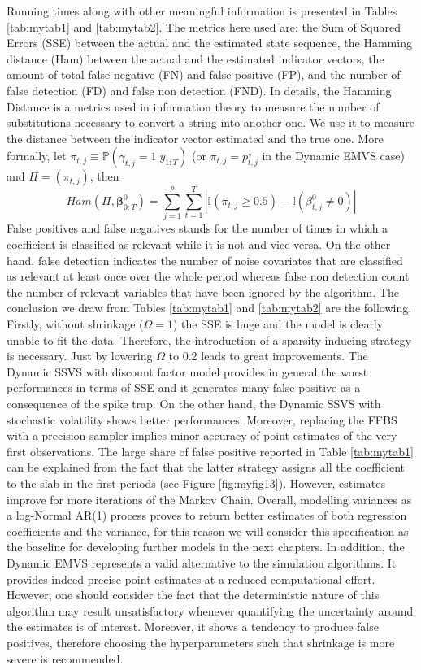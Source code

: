 \documentclass[
  12pt,
]{book}
\theoremstyle{break}
\theoremstyle{nonumberplain}
\begin{document}
Running times along with other meaningful information is presented in
Tables \ref{tab:mytab1} and \ref{tab:mytab2}. The metrics here used are:
the Sum of Squared Errors (SSE) between the actual and the estimated
state sequence, the Hamming distance (Ham) between the actual and the
estimated indicator vectors, the amount of total false negative (FN) and
false positive (FP), and the number of false detection (FD) and false
non detection (FND). In details, the Hamming Distance is a metrics used
in information theory to measure the number of substitutions necessary
to convert a string into another one. We use it to measure the distance
between the indicator vector estimated and the true one. More formally,
let \(\pi_{t,j}\equiv \mathbb{P}(\gamma_{t,j}=1|y_{1:T})\) (or
\(\pi_{t,j}=p^{\star}_{t,j}\) in the Dynamic EMVS case) and
\(\Pi=(\pi_{t,j})\), then \[
Ham(\Pi,\boldsymbol{\beta}_{0:T}^{0})=\sum_{j=1}^{p}\sum_{t=1}^{T}|\mathbb{I}(\pi_{t,j} \geq 0.5)-\mathbb{I}(\beta_{t,j}^{0}\neq 0)|
\] False positives and false negatives stands for the number of times in
which a coefficient is classified as relevant while it is not and vice
versa. On the other hand, false detection indicates the number of noise
covariates that are classified as relevant at least once over the whole
period whereas false non detection count the number of relevant
variables that have been ignored by the algorithm. The conclusion we
draw from Tables \ref{tab:mytab1} and \ref{tab:mytab2} are the
following. Firstly, without shrinkage (\(\Omega=1\)) the SSE is huge and
the model is clearly unable to fit the data. Therefore, the introduction
of a sparsity inducing strategy is necessary. Just by lowering
\(\Omega\) to 0.2 leads to great improvements. The Dynamic SSVS with
discount factor model provides in general the worst performances in
terms of SSE and it generates many false positive as a consequence of
the spike trap. On the other hand, the Dynamic SSVS with stochastic
volatility shows better performances. Moreover, replacing the FFBS with
a precision sampler implies minor accuracy of point estimates of the
very first observations. The large share of false positive reported in
Table \ref{tab:mytab1} can be explained from the fact that the latter
strategy assigns all the coefficient to the slab in the first periods
(see Figure \ref{fig:myfig13}). However, estimates improve for more
iterations of the Markov Chain. Overall, modelling variances as a
log-Normal AR(1) process proves to return better estimates of both
regression coefficients and the variance, for this reason we will
consider this specification as the baseline for developing further
models in the next chapters. In addition, the Dynamic EMVS represents a
valid alternative to the simulation algorithms. It provides indeed
precise point estimates at a reduced computational effort. However, one
should consider the fact that the deterministic nature of this algorithm
may result unsatisfactory whenever quantifying the uncertainty around
the estimates is of interest. Moreover, it shows a tendency to produce
false positives, therefore choosing the hyperparameters such that
shrinkage is more severe is recommended.
\end{document}
